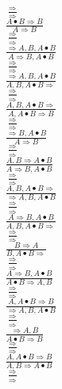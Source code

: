 \documentclass[11pt]{article}
\begin{document}
\begin{center}
\bigskip
\\$\frac{\Rightarrow }{\Rightarrow }$
\bigskip
\\$\frac{A\bullet B\Rightarrow B}{A\Rightarrow B}$
\bigskip
\\$\frac{\Rightarrow }{\Rightarrow }$
\bigskip
\\$\frac{\Rightarrow A, B, A\bullet B}{A\Rightarrow B, A\bullet B}$
\bigskip
\\$\frac{\Rightarrow }{\Rightarrow }$
\bigskip
\\$\frac{\Rightarrow A, B, A\bullet B}{A, B, A\bullet B\Rightarrow }$
\bigskip
\\$\frac{\Rightarrow }{\Rightarrow }$
\bigskip
\\$\frac{A, B, A\bullet B\Rightarrow }{A, A\bullet B\Rightarrow B}$
\bigskip
\\$\frac{\Rightarrow }{\Rightarrow }$
\bigskip
\\$\frac{\Rightarrow B, A\bullet B}{A\Rightarrow B}$
\bigskip
\\$\frac{\Rightarrow }{\Rightarrow }$
\bigskip
\\$\frac{A, B\Rightarrow A\bullet B}{A\Rightarrow B, A\bullet B}$
\bigskip
\\$\frac{\Rightarrow }{\Rightarrow }$
\bigskip
\\$\frac{A, B, A\bullet B\Rightarrow }{\Rightarrow A, B, A\bullet B}$
\bigskip
\\$\frac{\Rightarrow }{\Rightarrow }$
\bigskip
\\$\frac{A\Rightarrow B, A\bullet B}{A, B, A\bullet B\Rightarrow }$
\bigskip
\\$\frac{\Rightarrow }{\Rightarrow }$
\bigskip
\\$\frac{B\Rightarrow A}{B, A\bullet B\Rightarrow }$
\bigskip
\\$\frac{\Rightarrow }{\Rightarrow }$
\bigskip
\\$\frac{A\Rightarrow B, A\bullet B}{A\bullet B\Rightarrow A, B}$
\bigskip
\\$\frac{\Rightarrow }{\Rightarrow }$
\bigskip
\\$\frac{A, A\bullet B\Rightarrow B}{\Rightarrow A, B, A\bullet B}$
\bigskip
\\$\frac{\Rightarrow }{\Rightarrow }$
\bigskip
\\$\frac{\Rightarrow A, B}{A\bullet B\Rightarrow B}$
\bigskip
\\$\frac{\Rightarrow }{\Rightarrow }$
\bigskip
\\$\frac{A, A\bullet B\Rightarrow B}{A, B\Rightarrow A\bullet B}$
\bigskip
\\$\frac{\Rightarrow }{\Rightarrow }$

\end{center}
\end{document}
